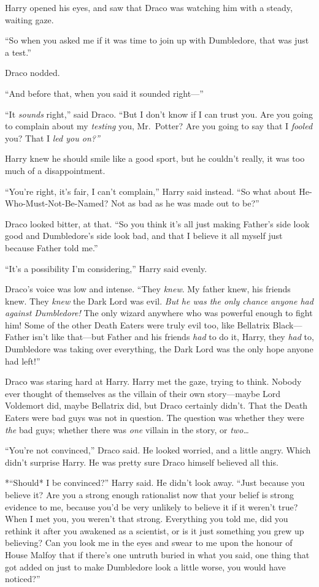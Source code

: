 Harry opened his eyes, and saw that Draco was watching him with a
steady, waiting gaze.

``So when you asked me if it was time to join up with Dumbledore, that
was just a test.''

Draco nodded.

``And before that, when you said it sounded right---''

``It \emph{sounds} right,'' said Draco. ``But I don't know if I can
trust you. Are you going to complain about my \emph{testing} you,
Mr.~Potter? Are you going to say that I \emph{fooled} you? That I
\emph{led you on?''}

Harry knew he should smile like a good sport, but he couldn't really, it
was too much of a disappointment.

``You're right, it's fair, I can't complain,'' Harry said instead. ``So
what about He-Who-Must-Not-Be-Named? Not as bad as he was made out to
be?''

Draco looked bitter, at that. ``So you think it's all just making
Father's side look good and Dumbledore's side look bad, and that I
believe it all myself just because Father told me.''

``It's a possibility I'm considering,'' Harry said evenly.

Draco's voice was low and intense. ``They \emph{knew}. My father knew,
his friends knew. They \emph{knew} the Dark Lord was evil. \emph{But he
was the only chance anyone had against Dumbledore!} The only wizard
anywhere who was powerful enough to fight him! Some of the other Death
Eaters were truly evil too, like Bellatrix Black---Father isn't like
that---but Father and his friends \emph{had} to do it, Harry, they
\emph{had} to, Dumbledore was taking over everything, the Dark Lord was
the only hope anyone had left!''

Draco was staring hard at Harry. Harry met the gaze, trying to think.
Nobody ever thought of themselves as the villain of their own
story---maybe Lord Voldemort did, maybe Bellatrix did, but Draco
certainly didn't. That the Death Eaters were bad guys was not in
question. The question was whether they were \emph{the} bad guys;
whether there was \emph{one} villain in the story, or \emph{two\ldots{}}

``You're not convinced,'' Draco said. He looked worried, and a little
angry. Which didn't surprise Harry. He was pretty sure Draco himself
believed all this.

*``Should* I be convinced?'' Harry said. He didn't look away. ``Just
because you believe it? Are you a strong enough rationalist now that
your belief is strong evidence to me, because you'd be very unlikely to
believe it if it weren't true? When I met you, you weren't that strong.
Everything you told me, did you rethink it after you awakened as a
scientist, or is it just something you grew up believing? Can you look
me in the eyes and swear to me upon the honour of House Malfoy that if
there's one untruth buried in what you said, one thing that got added on
just to make Dumbledore look a little worse, you would have noticed?''

